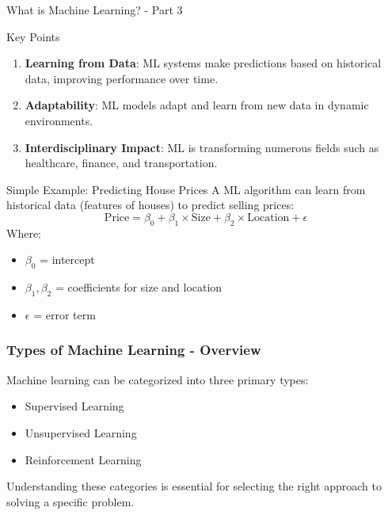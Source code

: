 \documentclass[aspectratio=169]{beamer}
\begin{document}
\begin{frame}[fragile]{What is Machine Learning? - Part 3}
  \begin{block}{Key Points}
    \begin{enumerate}
      \item \textbf{Learning from Data}: ML systems make predictions based on historical data, improving performance over time.
      \item \textbf{Adaptability}: ML models adapt and learn from new data in dynamic environments.
      \item \textbf{Interdisciplinary Impact}: ML is transforming numerous fields such as healthcare, finance, and transportation.
    \end{enumerate}
  \end{block}

  \begin{block}{Simple Example: Predicting House Prices}
    A ML algorithm can learn from historical data (features of houses) to predict selling prices:
    \begin{equation}
      \text{Price} = \beta_0 + \beta_1 \times \text{Size} + \beta_2 \times \text{Location} + \epsilon 
    \end{equation}
    Where:
    \begin{itemize}
      \item \( \beta_0 \) = intercept
      \item \( \beta_1, \beta_2 \) = coefficients for size and location
      \item \( \epsilon \) = error term
    \end{itemize}
  \end{block}
\end{frame}

\begin{frame}[fragile]
    \frametitle{Types of Machine Learning - Overview}
    Machine learning can be categorized into three primary types:
    \begin{itemize}
        \item Supervised Learning
        \item Unsupervised Learning
        \item Reinforcement Learning
    \end{itemize}
    Understanding these categories is essential for selecting the right approach to solving a specific problem.
\end{frame}
\end{document}
